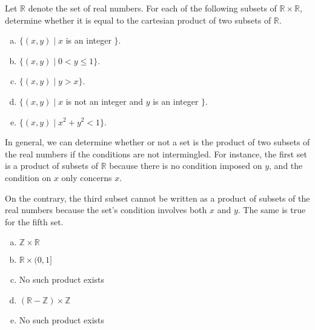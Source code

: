 \documentclass{zupan}
\begin{document}
\begin{problem}{10}
  Let $\mathbb{R}$ denote the set of real numbers. For each of the following
  subsets of $\mathbb{R} \times \mathbb{R}$, determine whether it is equal to
  the cartesian product of two subsets of $\mathbb{R}$.

  \begin{enumerate}[(a), noitemsep]
    \item $\{(x, y) \mid x$ is an integer $\}$.
    \item $\{(x, y) \mid 0 < y \leq 1\}$.
    \item $\{(x, y) \mid y > x\}$.
    \item $\{(x, y) \mid x$ is not an integer and $y$ is an integer $\}$.
    \item $\{(x, y) \mid x^2 + y^2 < 1\}$.
  \end{enumerate}
\end{problem}

\begin{solution}
  In general, we can determine whether or not a set is the product of two
  subsets of the real numbers if the conditions are not intermingled. For
  instance, the first set is a product of subsets of $\mathbb{R}$ because there
  is no condition imposed on $y$, and the condition on $x$ only concerns $x$.

  On the contrary, the third subset cannot be written as a product of subsets
  of the real numbers because the set's condition involves both $x$ and $y$.
  The same is true for the fifth set.

  \begin{enumerate}[(a), noitemsep]
    \item $\mathbb{Z} \times \mathbb{R}$
    \item $\mathbb{R} \times (0, 1]$
    \item No such product exists
    \item $(\mathbb{R} - \mathbb{Z}) \times \mathbb{Z}$
    \item No such product exists
  \end{enumerate}
\end{solution}
\end{document}
